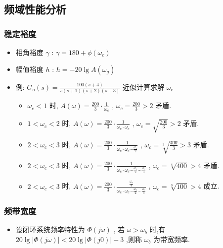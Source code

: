 \documentclass[table]{article}
\begin{document}
\subsection{频域性能分析}
\label{sec-5-1}
\begin{frame}
\frametitle{稳定裕度}
\label{sec-5-1-1}

\begin{itemize}
\item 相角裕度 $\gamma$ : $\gamma=180+\phi(\omega_c)$
\item 幅值裕度 $h$ : $h=-20\lg A(\omega_g)$
\item <2->例: $G_o(s)=\frac{100(s+4)}{s(s+1)(s+2)(s+3)}$ 近似计算求解 $\omega_c$
\begin{itemize}
\item <3->$\omega_c<1$   时, $A(\omega)=\frac{200}{3}\cdot\frac{1}{\omega_c}$ , $\omega_c=\frac{200}{3}>2$ 矛盾.
\item <4->$1<\omega_c<2$ 时, $A(\omega)=\frac{200}{3}\cdot\frac{1}{\omega_c\cdot\omega_c}$ , $\omega_c=\sqrt{\frac{200}{3}}>2$ 矛盾.
\item <5->$2<\omega_c<3$ 时, $A(\omega)=\frac{200}{3}\cdot\frac{1}{\omega_c\cdot\omega_c\cdots\frac{\omega_c}{2}}$ , $\omega_c=\sqrt[3]{\frac{400}{3}}>3$ 矛盾.
\item <6->$2<\omega_c<3$ 时, $A(\omega)=\frac{200}{3}\cdot\frac{1}{\omega_c\cdot\omega_c\cdots\frac{\omega_c}{2}\cdots\frac{\omega_c}{3}}$ , $\omega_c=\sqrt[4]{400}>4$ 矛盾.
\item <7->$2<\omega_c<3$ 时, $A(\omega)=\frac{200}{3}\cdot\frac{\frac{\omega_c}{4}}{\omega_c\cdot\omega_c\cdots\frac{\omega_c}{2}\cdots\frac{\omega_c}{3}}$ , $\omega_c=\sqrt[3]{100}>4$ 成立.
\end{itemize}
\end{itemize}
\end{frame}
\begin{frame}
\frametitle{频带宽度}
\label{sec-5-1-2}

\begin{itemize}
\item 设闭环系统频率特性为 $\Phi(j\omega)$ , 若 $\omega>\omega_b$ 时,有 $20\lg|\Phi(j\omega)| <20\lg|\Phi(j0)|-3$ ,则称 $\omega_b$ 为带宽频率.

\end{itemize}
\end{frame}
\end{document}
